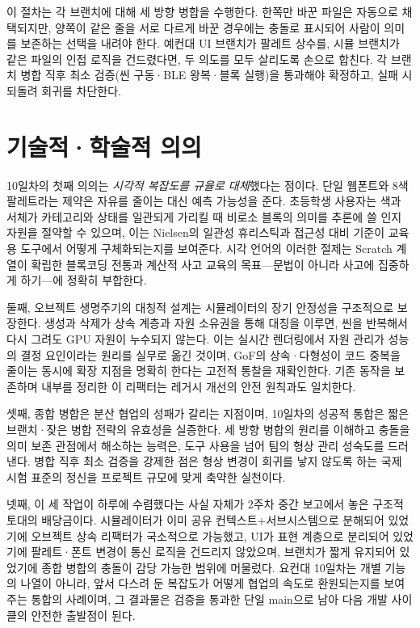 이 절차는 각 브랜치에 대해 세 방향 병합을 수행한다. 한쪽만 바꾼 파일은 자동으로 채택되지만, 양쪽이 같은 줄을 서로 다르게 바꾼 경우에는 충돌로 표시되어 사람이 의미를 보존하는 선택을 내려야 한다. 예컨대 UI 브랜치가 팔레트 상수를, 시뮬 브랜치가 같은 파일의 인접 로직을 건드렸다면, 두 의도를 모두 살리도록 손으로 합친다. 각 브랜치 병합 직후 최소 검증(씬 구동·BLE 왕복·블록 실행)을 통과해야 확정하고, 실패 시 되돌려 회귀를 차단한다.

\section{기술적·학술적 의의}

10일차의 첫째 의의는 \emph{시각적 복잡도를 규율로 대체}했다는 점이다. 단일 웹폰트와 8색 팔레트라는 제약은 자유를 줄이는 대신 예측 가능성을 준다. 초등학생 사용자는 색과 서체가 카테고리와 상태를 일관되게 가리킬 때 비로소 블록의 의미를 추론에 쓸 인지 자원을 절약할 수 있으며, 이는 Nielsen의 일관성 휴리스틱과 접근성 대비 기준이 교육용 도구에서 어떻게 구체화되는지를 보여준다\cite{nielsen1994heuristics,wcag21}. 시각 언어의 이러한 절제는 Scratch 계열이 확립한 블록코딩 전통과 계산적 사고 교육의 목표—문법이 아니라 사고에 집중하게 하기—에 정확히 부합한다\cite{resnick2009scratch,brennan2012ct}.

둘째, 오브젝트 생명주기의 대칭적 설계는 시뮬레이터의 장기 안정성을 구조적으로 보장한다. 생성과 삭제가 상속 계층과 자원 소유권을 통해 대칭을 이루면, 씬을 반복해서 다시 그려도 GPU 자원이 누수되지 않는다. 이는 실시간 렌더링에서 자원 관리가 성능의 결정 요인이라는 원리를 실무로 옮긴 것이며\cite{akenine2018realtime,webgl}, GoF의 상속·다형성이 코드 중복을 줄이는 동시에 확장 지점을 명확히 한다는 고전적 통찰을 재확인한다\cite{gof1994}. 기존 동작을 보존하며 내부를 정리한 이 리팩터는 레거시 개선의 안전 원칙과도 일치한다\cite{feathers2004legacy}.

셋째, 종합 병합은 분산 협업의 성패가 갈리는 지점이며, 10일차의 성공적 통합은 짧은 브랜치·잦은 병합 전략의 유효성을 실증한다. 세 방향 병합의 원리를 이해하고 충돌을 의미 보존 관점에서 해소하는 능력은, 도구 사용을 넘어 팀의 형상 관리 성숙도를 드러낸다\cite{chacon2014progit}. 병합 직후 최소 검증을 강제한 점은 형상 변경이 회귀를 낳지 않도록 하는 국제 시험 표준의 정신을 프로젝트 규모에 맞게 축약한 실천이다\cite{iso29119,ieee829}.

넷째, 이 세 작업이 하루에 수렴했다는 사실 자체가 2주차 중간 보고에서 놓은 구조적 토대의 배당금이다. 시뮬레이터가 이미 공유 컨텍스트+서브시스템으로 분해되어 있었기에 오브젝트 상속 리팩터가 국소적으로 가능했고, UI가 표현 계층으로 분리되어 있었기에 팔레트·폰트 변경이 통신 로직을 건드리지 않았으며, 브랜치가 짧게 유지되어 있었기에 종합 병합의 충돌이 감당 가능한 범위에 머물렀다. 요컨대 10일차는 개별 기능의 나열이 아니라, 앞서 다스려 둔 복잡도가 어떻게 협업의 속도로 환원되는지를 보여주는 통합의 사례이며\cite{fowler2018refactoring,mcconnell2004codecomplete}, 그 결과물은 검증을 통과한 단일 main으로 남아 다음 개발 사이클의 안전한 출발점이 된다.



